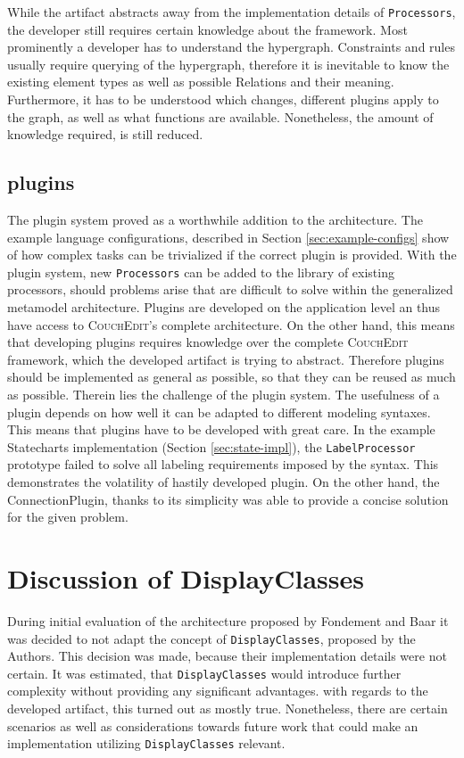 While the artifact abstracts away from the implementation details of \texttt{Processors}, the developer still requires certain knowledge about the framework. Most prominently a developer has to understand the hypergraph. Constraints and rules usually require querying of the hypergraph, therefore it is inevitable to know the existing element types as well as possible Relations and their meaning. Furthermore, it has to be understood which changes, different plugins apply to the graph, as well as what functions are available. Nonetheless, the amount of knowledge required, is still reduced.   

\subsection{plugins}
The plugin system proved as a worthwhile addition to the architecture. The example language configurations, described in Section \ref{sec:example-configs} show of how complex tasks can be trivialized if the correct plugin is provided. With the plugin system, new \texttt{Processors} can be added to the library of existing processors, should problems arise that are difficult to solve within the generalized metamodel architecture. Plugins are developed on the application level an thus have access to \textsc{CouchEdit}'s complete architecture. On the other hand, this means that developing plugins requires knowledge over the complete \textsc{CouchEdit} framework, which the developed artifact is trying to abstract. Therefore plugins should be implemented as general as possible, so that they can be reused as much as possible. Therein lies the challenge of the plugin system. The usefulness of a plugin depends on how well it can be adapted to different modeling syntaxes. This means that plugins have to be developed with great care. In the example Statecharts implementation (Section \ref{sec:state-impl}), the \texttt{LabelProcessor} prototype failed to solve all labeling requirements imposed by the syntax. This demonstrates the volatility of hastily developed plugin. On the other hand, the ConnectionPlugin, thanks to its simplicity was able to provide a concise solution for the given problem.

\section{Discussion of DisplayClasses}
During initial evaluation of the architecture proposed by Fondement and Baar \cite{fondement_making_2005} it was decided to not adapt the concept of \texttt{DisplayClasses}, proposed by the Authors. This decision was made, because their implementation details were not certain. It was estimated, that \texttt{DisplayClasses} would introduce further complexity without providing any significant advantages. with regards to the developed artifact, this turned out as mostly true. Nonetheless, there are certain scenarios as well as considerations towards future work that could make an implementation utilizing \texttt{DisplayClasses} relevant.  

